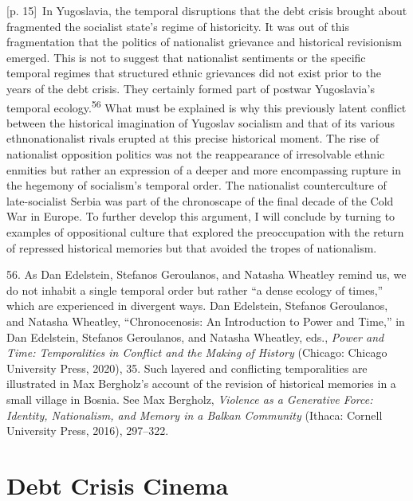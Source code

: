\documentclass[10pt,a4paper]{article}
\begin{document}
{\scriptsize\color{gray} [p. 15]}\ In Yugoslavia, the temporal disruptions that the debt crisis brought about fragmented the socialist state’s regime of historicity. It was out of this fragmentation that the politics of nationalist grievance and historical revisionism emerged. This is not to suggest that nationalist sentiments or the specific temporal regimes that structured ethnic grievances did not exist prior to the years of the debt crisis. They certainly formed part of postwar Yugoslavia’s temporal ecology.\nobreak\textsuperscript{56} What must be explained is why this previously latent conflict between the historical imagination of Yugoslav socialism and that of its various ethnonationalist rivals erupted at this precise historical moment. The rise of nationalist opposition politics was not the reappearance of irresolvable ethnic enmities but rather an expression of a deeper and more encompassing rupture in the hegemony of socialism’s temporal order. The nationalist counterculture of late-socialist Serbia was part of the chronoscape of the final decade of the Cold War in Europe. To further develop this argument, I will conclude by turning to examples of oppositional culture that explored the preoccupation with the return of repressed historical memories but that avoided the tropes of nationalism.\par{\small 56. As Dan Edelstein, Stefanos Geroulanos, and Natasha Wheatley remind us, we do not inhabit a single temporal order but rather “a dense ecology of times,” which are experienced in divergent ways. Dan Edelstein, Stefanos Geroulanos, and Natasha Wheatley, “Chronocenosis: An Introduction to Power and Time,” in Dan Edelstein, Stefanos Geroulanos, and Natasha Wheatley, eds., \textit{Power and Time: Temporalities in Conflict and the Making of History} (Chicago: Chicago University Press, 2020), 35. Such layered and conflicting temporalities are illustrated in Max Bergholz’s account of the revision of historical memories in a small village in Bosnia. See Max Bergholz, \textit{Violence as a Generative Force: Identity, Nationalism, and Memory in a Balkan Community} (Ithaca: Cornell University Press, 2016), 297–322.\par}
\section*{Debt Crisis Cinema}
\end{document}
